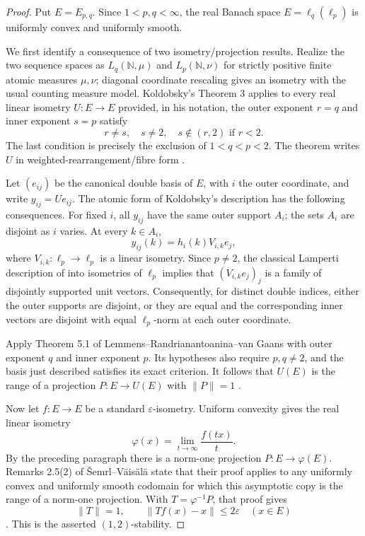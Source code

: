 \documentclass[11pt]{article}
\begin{document}
\begin{proof}
Put $E=E_{p,q}$.  Since $1<p,q<\infty$, the real Banach space
$E=\ell_q(\ell_p)$ is uniformly convex and uniformly smooth.

We first identify a consequence of two isometry/projection results.  Realize
the two sequence spaces as $L_q(\mathbb N,\mu)$ and
$L_p(\mathbb N,\nu)$ for strictly positive finite atomic measures $\mu,\nu$;
diagonal coordinate rescaling gives an isometry with the usual counting
measure model.  Koldobsky's Theorem 3 applies to every real linear isometry
$U:E\to E$ provided, in his notation, the outer exponent $r=q$ and inner
exponent $s=p$ satisfy
\[
 r\ne s,\quad s\ne2,\quad s\notin(r,2)\text{ if }r<2.
\]
The last condition is precisely the exclusion of $1<q<p<2$.
The theorem writes $U$ in weighted-rearrangement/fibre form
\cite[Theorem 3, pp.~697--699]{Koldobsky}.

Let $(e_{ij})$ be the canonical double basis of $E$, with $i$ the outer
coordinate, and write $y_{ij}=Ue_{ij}$.  The atomic form of Koldobsky's
description has the following consequences.
For fixed $i$, all $y_{ij}$ have the same outer support $A_i$; the sets
$A_i$ are disjoint as $i$ varies.  At every $k\in A_i$,
\[
 y_{ij}(k)=h_i(k)V_{i,k}e_j,
\]
where $V_{i,k}:\ell_p\to\ell_p$ is a linear isometry.  Since $p\ne2$,
the classical Lamperti description of into isometries of $\ell_p$ implies
that $(V_{i,k}e_j)_j$ is a family of disjointly supported unit vectors.
Consequently, for distinct double indices, either the outer supports are
disjoint, or they are equal and the corresponding inner vectors are
disjoint with equal $\ell_p$-norm at each outer coordinate.

Apply Theorem 5.1 of Lemmens--Randrianantoanina--van Gaans with outer
exponent $q$ and inner exponent $p$.  Its hypotheses also require
$p,q\ne2$, and the basis just described satisfies its exact criterion.
It follows that $U(E)$ is the range of a projection $P:E\to U(E)$ with
$\|P\|=1$ \cite[Theorem 5.1, p.~19]{LRvG}.

Now let $f:E\to E$ be a standard $\varepsilon$-isometry.  Uniform convexity
gives the real linear isometry
\[
 \varphi(x)=\lim_{t\to\infty}\frac{f(tx)}{t}.
\]
By the preceding paragraph there is a norm-one projection $P:E\to\varphi(E)$.
Remarks 2.5(2) of \v Semrl--V\"ais\"al\"a state that their proof applies to
any uniformly convex and uniformly smooth codomain for which this asymptotic
copy is the range of a norm-one projection.  With
$T=\varphi^{-1}P$, that proof gives
\[
 \|T\|=1,
 \qquad
 \|Tf(x)-x\|\leq2\varepsilon
 \quad(x\in E)
\]
\cite[Remarks 2.5(2), p.~9]{SV}.  This is the asserted $(1,2)$-stability.
\end{proof}
\end{document}
